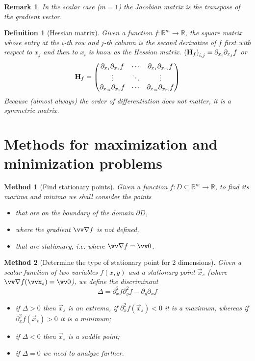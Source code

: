 \documentclass[twocolumn, margin=normal]{tex/hsrzf}
\theoremstyle{fuvarzf}
\newtheorem{method}{Method}
\newtheorem{definition}{Definition}
\newtheorem{remark}{Remark}
\begin{document}
\begin{remark}
  In the scalar case (\(m = 1\)) the Jacobian matrix is the transpose of the
  gradient vector.
\end{remark}

\begin{definition}[Hessian matrix]
  Given a function \(f: \mathbb{R}^m \to \mathbb{R}\), the square matrix whose
  entry at the \(i\)-th row and \(j\)-th column is the second derivative of
  \(f\) first with respect to \(x_j\) and then to \(x_i\) is know as the
  \emph{Hessian} matrix.
  \(
    \left(\bm{\mathrm{H}}_f\right)_{i,j} = \partial_{x_i}\partial_{x_j} f
  \)
  or
  \[
    \bm{\mathrm{H}}_f = \begin{pmatrix}
      \partial_{x_1}\partial_{x_1} f & \cdots & \partial_{x_1}\partial_{x_m} f \\
      \vdots & \ddots & \vdots \\
      \partial_{x_m}\partial_{x_1} f & \cdots & \partial_{x_m}\partial_{x_m} f \\
    \end{pmatrix}
  \]
  Because (almost always) the order of differentiation
  does not matter, it is a symmetric matrix.
\end{definition}


\section{Methods for maximization and minimization problems}

\begin{method}[Find stationary points]
  Given a function \(f: D \subseteq \mathbb{R}^m \to \mathbb{R}\), to
  find its maxima and minima we shall consider the points
  \begin{itemize}
    \item that are on the boundary of the domain \(\partial D\),
    \item where the gradient \(\grad f\) is not defined,
    \item that are stationary, i.e. where \(\grad f = \vec{0}\).
  \end{itemize}
\end{method}

\begin{method}[Determine the type of stationary point for 2 dimensions]
  Given a scalar function of two variables \(f(x,y)\) and a stationary point
  \(\vec{x}_s\) (where \(\grad f(\vec{x}_s) = \vec{0}\)), we define the
  \emph{discriminant}
  \[
    \Delta = \partial_x^2 f \partial_y^2 f - \partial_y \partial_x f
  \]
  \begin{itemize}
    \item if \(\Delta > 0\) then \(\vec{x}_s\) is an extrema, if \(\partial_x^2
      f(\vec{x}_s) < 0\) it is a maximum, whereas if \(\partial_x^2
      f(\vec{x}_s) > 0\) it is a minimum;

    \item if \(\Delta < 0\) then \(\vec{x}_s\) is a saddle point;

    \item if \(\Delta = 0\) we need to analyze further.
  \end{itemize}
\end{method}
\end{document}
